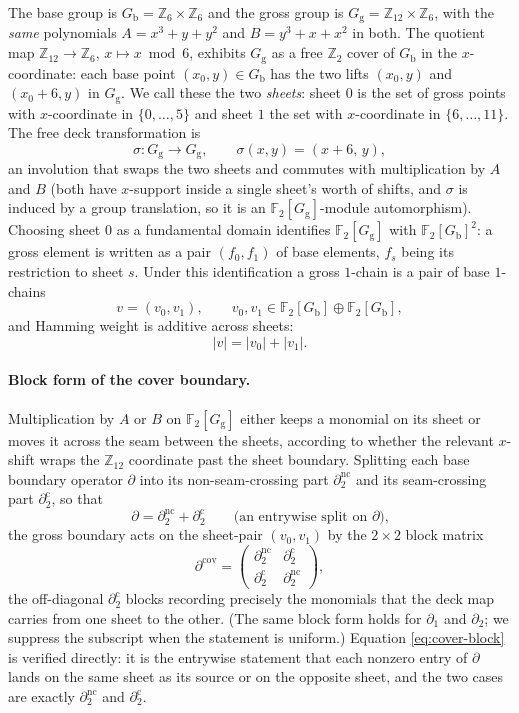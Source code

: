 \documentclass[11pt]{article}
\newcommand{\Z}{\mathbb{Z}}
\newcommand{\F}[1]{\mathbb{F}_{#1}}
\newcommand{\wt}[1]{\lvert #1\rvert}
\newcommand{\dcut}{\partial_2^{\mathrm{c}}}     %
\newcommand{\dncut}{\partial_2^{\mathrm{nc}}}   %
\theoremstyle{plain}
\theoremstyle{definition}
\theoremstyle{remark}
\begin{document}
The base group is $G_{\mathrm b}=\Z_6\times\Z_6$ and the gross group is
$G_{\mathrm g}=\Z_{12}\times\Z_6$, with the \emph{same} polynomials $A=x^3+y+y^2$ and
$B=y^3+x+x^2$ in both. The quotient map $\Z_{12}\to\Z_6$, $x\mapsto x\bmod 6$, exhibits
$G_{\mathrm g}$ as a free $\Z_2$ cover of $G_{\mathrm b}$ in the $x$-coordinate: each
base point $(x_0,y)\in G_{\mathrm b}$ has the two lifts $(x_0,y)$ and $(x_0+6,y)$ in
$G_{\mathrm g}$. We call these the two \emph{sheets}: sheet $0$ is the set of gross points
with $x$-coordinate in $\{0,\dots,5\}$ and sheet $1$ the set with $x$-coordinate in
$\{6,\dots,11\}$. The free deck transformation is
\[
  \sigma\colon G_{\mathrm g}\to G_{\mathrm g},\qquad \sigma(x,y)=(x+6,\,y),
\]
an involution that swaps the two sheets and commutes with multiplication by $A$ and $B$
(both have $x$-support inside a single sheet's worth of shifts, and $\sigma$ is induced by
a group translation, so it is an $\F2[G_{\mathrm g}]$-module automorphism). Choosing sheet
$0$ as a fundamental domain identifies $\F2[G_{\mathrm g}]$ with $\F2[G_{\mathrm b}]^2$:
a gross element is written as a pair $(f_0,f_1)$ of base elements, $f_s$ being its
restriction to sheet $s$. Under this identification a gross $1$-chain is a pair of base
$1$-chains
\[
  v=(v_0,v_1),\qquad v_0,v_1\in\F2[G_{\mathrm b}]\oplus\F2[G_{\mathrm b}],
\]
and Hamming weight is additive across sheets:
\begin{equation}\label{eq:cover-weight}
  \wt{v}=\wt{v_0}+\wt{v_1}.
\end{equation}

\paragraph{Block form of the cover boundary.}
Multiplication by $A$ or $B$ on $\F2[G_{\mathrm g}]$ either keeps a monomial on its sheet
or moves it across the seam between the sheets, according to whether the relevant
$x$-shift wraps the $\Z_{12}$ coordinate past the sheet boundary. Splitting each base
boundary operator $\partial$ into its non-seam-crossing part $\dncut$ and its
seam-crossing part $\dcut$, so that
\[
  \partial=\dncut+\dcut\qquad\text{(an entrywise split on $\partial$),}
\]
the gross boundary acts on the sheet-pair $(v_0,v_1)$ by the $2\times2$ block matrix
\begin{equation}\label{eq:cover-block}
  \partial^{\mathrm{cov}}
  =\begin{pmatrix}\dncut & \dcut\\[2pt] \dcut & \dncut\end{pmatrix},
\end{equation}
the off-diagonal $\dcut$ blocks recording precisely the monomials that the deck map
carries from one sheet to the other. (The same block form holds for $\partial_1$ and
$\partial_2$; we suppress the subscript when the statement is uniform.) Equation
\eqref{eq:cover-block} is verified directly: it is the entrywise statement that each
nonzero entry of $\partial$ lands on the same sheet as its source or on the opposite
sheet, and the two cases are exactly $\dncut$ and $\dcut$.
\end{document}
